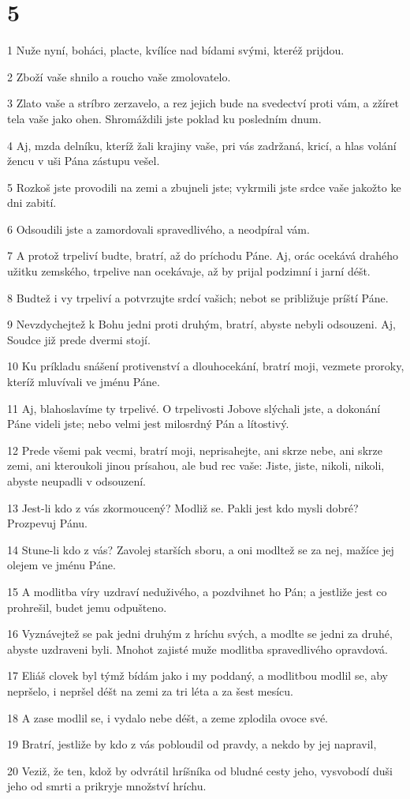\chapter{5}

\par 1 Nuže nyní, boháci, placte, kvílíce nad bídami svými, kteréž prijdou.
\par 2 Zboží vaše shnilo a roucho vaše zmolovatelo.
\par 3 Zlato vaše a stríbro zerzavelo, a rez jejich bude na svedectví proti vám, a zžíret tela vaše jako ohen. Shromáždili jste poklad ku posledním dnum.
\par 4 Aj, mzda delníku, kteríž žali krajiny vaše, pri vás zadržaná, kricí, a hlas volání žencu v uši Pána zástupu vešel.
\par 5 Rozkoš jste provodili na zemi a zbujneli jste; vykrmili jste srdce vaše jakožto ke dni zabití.
\par 6 Odsoudili jste a zamordovali spravedlivého, a neodpíral vám.
\par 7 A protož trpeliví budte, bratrí, až do príchodu Páne. Aj, orác ocekává drahého užitku zemského, trpelive nan ocekávaje, až by prijal podzimní i jarní déšt.
\par 8 Budtež i vy trpeliví a potvrzujte srdcí vašich; nebot se približuje príští Páne.
\par 9 Nevzdychejtež k Bohu jedni proti druhým, bratrí, abyste nebyli odsouzeni. Aj, Soudce již prede dvermi stojí.
\par 10 Ku príkladu snášení protivenství a dlouhocekání, bratrí moji, vezmete proroky, kteríž mluvívali ve jménu Páne.
\par 11 Aj, blahoslavíme ty trpelivé. O trpelivosti Jobove slýchali jste, a dokonání Páne videli jste; nebo velmi jest milosrdný Pán a lítostivý.
\par 12 Prede všemi pak vecmi, bratrí moji, neprisahejte, ani skrze nebe, ani skrze zemi, ani kteroukoli jinou prísahou, ale bud rec vaše: Jiste, jiste, nikoli, nikoli, abyste neupadli v odsouzení.
\par 13 Jest-li kdo z vás zkormoucený? Modliž se. Pakli jest kdo mysli dobré? Prozpevuj Pánu.
\par 14 Stune-li kdo z vás? Zavolej starších sboru, a oni modltež se za nej, mažíce jej olejem ve jménu Páne.
\par 15 A modlitba víry uzdraví neduživého, a pozdvihnet ho Pán; a jestliže jest co prohrešil, budet jemu odpušteno.
\par 16 Vyznávejtež se pak jedni druhým z hríchu svých, a modlte se jedni za druhé, abyste uzdraveni byli. Mnohot zajisté muže modlitba spravedlivého opravdová.
\par 17 Eliáš clovek byl týmž bídám jako i my poddaný, a modlitbou modlil se, aby nepršelo, i nepršel déšt na zemi za tri léta a za šest mesícu.
\par 18 A zase modlil se, i vydalo nebe déšt, a zeme zplodila ovoce své.
\par 19 Bratrí, jestliže by kdo z vás pobloudil od pravdy, a nekdo by jej napravil,
\par 20 Veziž, že ten, kdož by odvrátil hríšníka od bludné cesty jeho, vysvobodí duši jeho od smrti a prikryje množství hríchu.


